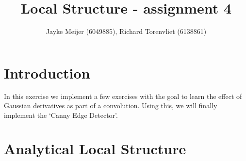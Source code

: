 \documentclass[10pt,a4paper]{article}
\title{Local Structure - assignment 4}
\author{Jayke Meijer (6049885), Richard Torenvliet (6138861)}
\begin{document}
\maketitle

\section{Introduction}

In this exercise we implement a few exercises with the goal to learn 
the effect of Gaussian derivatives as part of a convolution. Using this,
we will finally implement the `Canny Edge Detector'.

\section{Analytical Local Structure}
\end{document}
